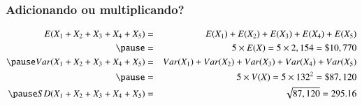 \begin{frame}
\frametitle{Adicionando ou multiplicando?}

\begin{eqnarray*} 

E(X_1 + X_2 + X_3 + X_4 + X_5) &=& E(X_1) + E(X_2) + E(X_3) + E(X_4) + E(X_5) \\
\pause

&=& 5 \times E(X) = 5 \times 2,154 = \$ 10,770 \\
\pause

Var(X_1 + X_2 + X_3 + X_4 + X_5) &=& Var(X_1) + Var(X_2) + Var(X_3) + Var(X_4) + Var(X_5) \\
\pause

&=& 5 \times V(X) = 5 \times 132^2 = \$ 87,120 \\
\pause

SD(X_1 + X_2 + X_3 + X_4 + X_5) &=& \sqrt{87,120} =  295.16

\end{eqnarray*}


\end{frame}
